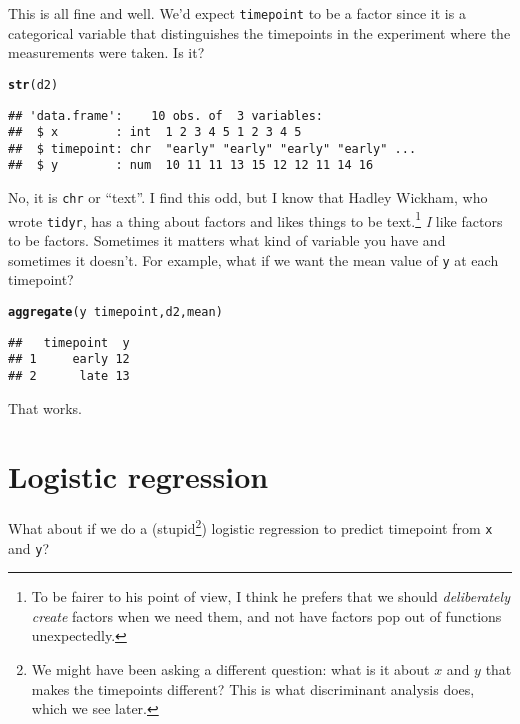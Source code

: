 \documentclass{article}\usepackage[]{graphicx}\usepackage[]{color}
\makeatletter
\newcommand{\hlopt}[1]{\textcolor[rgb]{0,0,0}{#1}}%
\newcommand{\hlstd}[1]{\textcolor[rgb]{0.345,0.345,0.345}{#1}}%
\newcommand{\hlkwd}[1]{\textcolor[rgb]{0.737,0.353,0.396}{\textbf{#1}}}%
\newenvironment{kframe}{%
 \def\at@end@of@kframe{}%
 \ifinner\ifhmode%
  \def\at@end@of@kframe{\end{minipage}}%
  \begin{minipage}{\columnwidth}%
 \fi\fi%
 \def\FrameCommand##1{\hskip\@totalleftmargin \hskip-\fboxsep
 \colorbox{shadecolor}{##1}\hskip-\fboxsep
     \hskip-\linewidth \hskip-\@totalleftmargin \hskip\columnwidth}%
 \MakeFramed {\advance\hsize-\width
   \@totalleftmargin\z@ \linewidth\hsize
   \@setminipage}}%
 {\par\unskip\endMakeFramed%
 \at@end@of@kframe}
\newenvironment{knitrout}{}{} %
\makeatother
\begin{document}
This is all fine and well. We'd expect \texttt{timepoint} to be a
factor since it is a categorical variable that distinguishes the
timepoints in the experiment where the measurements were taken. Is it?

\begin{knitrout}
\color{fgcolor}\begin{kframe}
\begin{alltt}
\hlkwd{str}\hlstd{(d2)}
\end{alltt}
\begin{verbatim}
## 'data.frame':	10 obs. of  3 variables:
##  $ x        : int  1 2 3 4 5 1 2 3 4 5
##  $ timepoint: chr  "early" "early" "early" "early" ...
##  $ y        : num  10 11 11 13 15 12 12 11 14 16
\end{verbatim}
\end{kframe}
\end{knitrout}

No, it is \texttt{chr} or ``text''. I find this odd, but I know that
Hadley Wickham, who wrote \texttt{tidyr}, has a thing about factors
and likes things to be text.\footnote{To be fairer to his point of
  view, I think he prefers that we should \emph{deliberately create}
  factors when we need them, and not have factors pop out of functions
unexpectedly.} \emph{I} like factors to be
factors. Sometimes it matters what kind of variable you have and
sometimes it doesn't. For example, what if we want the mean value of
\texttt{y} at each timepoint?

\begin{knitrout}
\color{fgcolor}\begin{kframe}
\begin{alltt}
\hlkwd{aggregate}\hlstd{(y}\hlopt{~}\hlstd{timepoint,d2,mean)}
\end{alltt}
\begin{verbatim}
##   timepoint  y
## 1     early 12
## 2      late 13
\end{verbatim}
\end{kframe}
\end{knitrout}

That works. 

\section{Logistic regression}

What about if we do a (stupid\footnote{We might have been asking a
  different question: what is it about $x$ and $y$ that makes the
  timepoints different? This is what discriminant analysis does, which
we see later.}) logistic regression to
predict timepoint from \texttt{x} and \texttt{y}?
\end{document}
